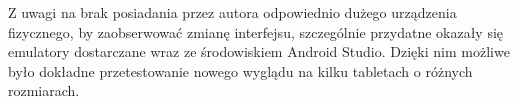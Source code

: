 
Z uwagi na brak posiadania przez autora odpowiednio dużego urządzenia fizycznego, by zaobserwować zmianę interfejsu, szczególnie przydatne okazały się emulatory dostarczane wraz ze środowiskiem Android Studio. Dzięki nim możliwe było dokładne przetestowanie nowego wyglądu na kilku tabletach o różnych rozmiarach.
